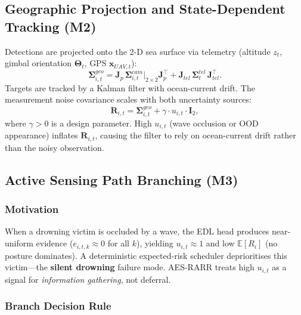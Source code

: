 \documentclass[11pt,a4paper]{article}
\begin{document}
\subsection{Geographic Projection and State-Dependent Tracking (M2)}

Detections are projected onto the 2-D sea surface via telemetry
(altitude $z_t$, gimbal orientation $\boldsymbol{\Theta}_t$, GPS
$\mathbf{x}_{UAV,t}$):
\begin{equation}
  \boldsymbol{\Sigma}^{geo}_{i,t}
  = \mathbf{J}_p\,\boldsymbol{\Sigma}^{cam}_{i,t}\big|_{2\times2}\mathbf{J}_p^{\top}
  + \mathbf{J}_{tel}\,\boldsymbol{\Sigma}^{tel}_t\,\mathbf{J}_{tel}^{\top}.
\end{equation}
Targets are tracked by a Kalman filter with ocean-current drift.
The measurement noise covariance scales with both uncertainty sources:
\begin{equation}
  \mathbf{R}_{i,t}
  = \boldsymbol{\Sigma}^{geo}_{i,t} + \gamma \cdot u_{i,t} \cdot \mathbf{I}_2,
  \label{eq:R}
\end{equation}
where $\gamma > 0$ is a design parameter.
High $u_{i,t}$ (wave occlusion or OOD appearance) inflates $\mathbf{R}_{i,t}$,
causing the filter to rely on ocean-current drift rather than the noisy
observation.

\subsection{Active Sensing Path Branching (M3)}
\label{sec:active_sensing}

\subsubsection{Motivation}

When a drowning victim is occluded by a wave, the EDL head produces near-uniform
evidence ($e_{i,t,k} \approx 0$ for all $k$), yielding $u_{i,t} \approx 1$ and
low $\mathbb{E}[R_i]$ (no posture dominates).
A deterministic expected-risk scheduler deprioritises this victim---the
\textbf{silent drowning} failure mode.
AES-RARR treats high $u_{i,t}$ as a signal for \emph{information gathering},
not deferral.

\subsubsection{Branch Decision Rule}
\end{document}
